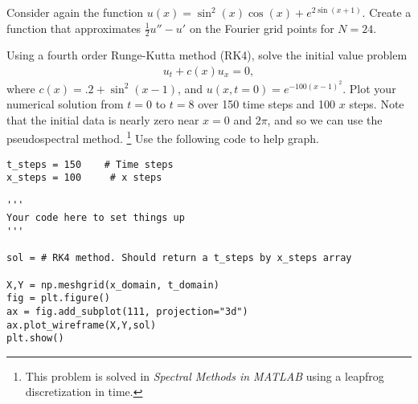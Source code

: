 
Consider again the function $u(x) = \sin^2 (x) \cos(x) +e^{2\sin(x+1)}$.
Create a function that approximates $\frac{1}{2}u''-u'$ on the Fourier grid points for $N=24$.	

% 
	Using a fourth order Runge-Kutta method (RK4), solve the initial value problem 
	\begin{align}
		u_t +c(x) u_x = 0,
	\end{align}
	where $c(x) = .2 + \sin^2(x-1)$, and $u(x,t=0) = e^{-100(x-1)^2}.$  Plot your numerical solution from $t = 0$ to $t = 8$ over 150 time steps and 100 $x$ steps.  Note that the initial data is nearly zero near $x = 0$ and  $2 \pi$, and so we can use the pseudospectral method. \footnote{This problem is solved in \textit{Spectral Methods in MATLAB} using a leapfrog discretization in time. } 
	\label{spectral2:advection_equation}
	Use the following code to help graph.
\begin{lstlisting}
t_steps = 150    # Time steps
x_steps = 100     # x steps

'''
Your code here to set things up
'''

sol = # RK4 method. Should return a t_steps by x_steps array

X,Y = np.meshgrid(x_domain, t_domain)
fig = plt.figure()
ax = fig.add_subplot(111, projection="3d")
ax.plot_wireframe(X,Y,sol)
plt.show()

\end{lstlisting}


